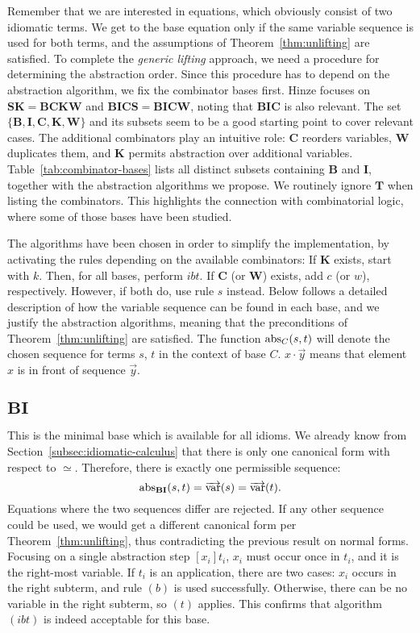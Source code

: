 Remember that we are interested in equations, which obviously consist of two
idiomatic terms.
We get to the base equation only if the same variable sequence is used for both
terms, and the assumptions of Theorem~\ref{thm:unlifting} are satisfied.
To complete the \emph{generic lifting} approach, we need a procedure for
determining the abstraction order.
Since this procedure has to depend on the abstraction algorithm, we fix the
combinator bases first.
Hinze focuses on $\mathbf{SK = BCKW}$ and $\mathbf{BICS = BICW}$, noting
that $\mathbf{BIC}$ is also relevant.
The set $\{\mathbf{B,I,C,K,W}\}$ and its subsets seem to be a good starting
point to cover relevant cases.
The additional combinators play an intuitive role:
$\mathbf{C}$ reorders variables, $\mathbf{W}$ duplicates them, and $\mathbf{K}$
permits abstraction over additional variables.
Table~\ref{tab:combinator-bases} lists all distinct subsets containing
$\mathbf{B}$ and $\mathbf{I}$, together with the abstraction algorithms we
propose.
We routinely ignore $\mathbf{T}$ when listing the combinators.
This highlights the connection with combinatorial logic, where some of those
bases have been studied.

The algorithms have been chosen in order to simplify the implementation, by
activating the rules depending on the available combinators:
If $\mathbf{K}$ exists, start with $k$.
Then, for all bases, perform $ibt$.
If $\mathbf{C}$ (or $\mathbf{W}$) exists, add $c$ (or $w$), respectively.
However, if both do, use rule $s$ instead.
Below follows a detailed description of how the variable sequence can be found
in each base, and we justify the abstraction algorithms, meaning that the
preconditions of Theorem~\ref{thm:unlifting} are satisfied.
The function $\operatorname{abs}_C(s,t)$ will denote the chosen sequence for terms $s$, $t$
in the context of base $C$.
$x \cdot \vec y$ means that element $x$ is in front of sequence $\vec y$.

\subsection*{$\mathbf{BI}$}\label{subsec:base-bi}

This is the minimal base which is available for all idioms.
We already know from Section~\ref{subsec:idiomatic-calculus} that there is only
one canonical form with respect to $\simeq$.
Therefore, there is exactly one permissible sequence:
\[ \operatorname{abs}_\mathbf{BI}(s,t) = \overrightarrow{\operatorname{var}}(s) = \overrightarrow{\operatorname{var}}(t). \]
Equations where the two sequences differ are rejected.
If any other sequence could be used, we would get a different canonical form
per Theorem~\ref{thm:unlifting}, thus contradicting the previous result on
normal forms.
Focusing on a single abstraction step $[x_i]t_i$, $x_i$ must occur once in
$t_i$, and it is the right-most variable.
If $t_i$ is an application, there are two cases:
$x_i$ occurs in the right subterm, and rule $(b)$ is used successfully.
Otherwise, there can be no variable in the right subterm, so $(t)$ applies.
This confirms that algorithm $(ibt)$ is indeed acceptable for this base.

